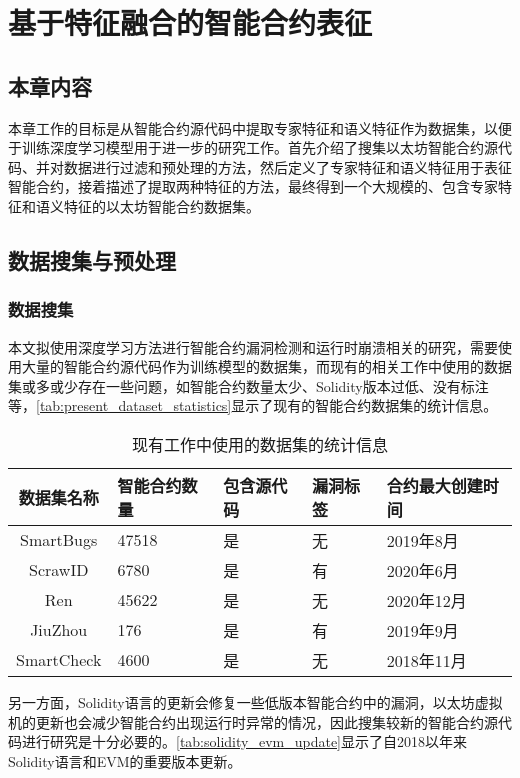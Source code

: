 \chapter{基于特征融合的智能合约表征}
\section{本章内容}
\label{sec:本章内容3}
本章工作的目标是从智能合约源代码中提取专家特征和语义特征作为数据集，以便于训练深度学习模型用于进一步的研究工作。首先介绍了搜集以太坊智能合约源代码、并对数据进行过滤和预处理的方法，然后定义了专家特征和语义特征用于表征智能合约，接着描述了提取两种特征的方法，最终得到一个大规模的、包含专家特征和语义特征的以太坊智能合约数据集。
\section{数据搜集与预处理}
\label{sec:数据搜集与预处理}
\subsection{数据搜集}
\label{sec:数据搜集}
本文拟使用深度学习方法进行智能合约漏洞检测和运行时崩溃相关的研究，需要使用大量的智能合约源代码作为训练模型的数据集，而现有的相关工作中使用的数据集或多或少存在一些问题，如智能合约数量太少、Solidity版本过低、没有标注等，\autoref{tab:present_dataset_statistics}显示了现有的智能合约数据集的统计信息。
\begin{table}[htbp]
    \caption{\label{tab:present_dataset_statistics}现有工作中使用的数据集的统计信息}
    \small
    \renewcommand{\arraystretch}{1.5}
    \begin{tabularx}{\linewidth}{cX<{\centering}X<{\centering}X<{\centering}p{3cm}}
        \hline
    数据集名称     & 智能合约数量 & 包含源代码 & 漏洞标签 & 合约最大创建时间            \\ \hline
    SmartBugs\cite{smartbugs} & 47518  & 是 & 无 & 2019年8月 \\
    ScrawID\cite{yashavant2022scrawld}    & 6780 & 是   & 有  & 2020年6月 \\
    Ren\cite{ren2021} &  45622 & 是 & 无 & 2020年12月 \\
    JiuZhou\cite{jiuzhou}   & 176  & 是  & 有   & 2019年9月 \\
    SmartCheck\cite{smartcheck}       & 4600   & 是 & 无 & 2018年11月  \\  \hline
    \end{tabularx}
\end{table}
另一方面，Solidity语言的更新会修复一些低版本智能合约中的漏洞，以太坊虚拟机的更新也会减少智能合约出现运行时异常的情况，因此搜集较新的智能合约源代码进行研究是十分必要的。\autoref{tab:solidity_evm_update}显示了自2018以年来Solidity语言和EVM的重要版本更新。

